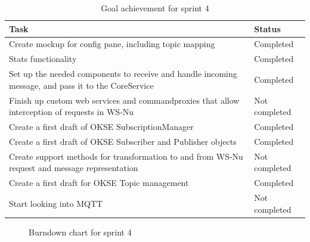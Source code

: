 \begin{table}[ht!]
\small
\centering
\begin{tabular}{ | p{10cm} | p{2cm} |}
\hline
 \rowcolor{lightgray}
 \textbf{Task} & \textbf{Status} \\
\hline
\rowcolor{green!30}
Create mockup for config pane, including topic mapping & Completed \\
\rowcolor{green!30}
Stats functionality	& Completed \\
\rowcolor{green!30}
Set up the needed components to receive and handle incoming message, and pass it to the CoreService	& Completed \\
\rowcolor{orange!40}
Finish up custom web services and commandproxies that allow interception of requests in WS-Nu	& Not completed \\
\rowcolor{green!30}
Create a first draft of OKSE SubscriptionManager & Completed \\
\rowcolor{green!30}
Create a first draft of OKSE Subscriber and Publisher objects & Completed \\
\rowcolor{orange!40}
Create support methods for transformation to and from WS-Nu request and message representation	& Not completed \\
\rowcolor{green!30}
Create a first draft for OKSE Topic management & Completed \\
\rowcolor{orange!40}
Start looking into MQTT	& Not completed \\
\hline
\end{tabular}
\caption{Goal achievement for sprint 4}
\label{tab:sprint 4, goals}
\end{table}

\begin{center}
  \begin{figure}[ht!]
    \caption{Burndown chart for sprint 4}
    \label{fig:sprint 4, burndown}
  \end{figure}
\end{center}

